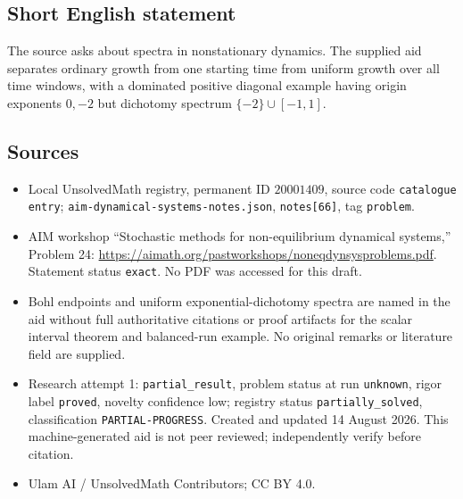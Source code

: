 \documentclass[11pt]{article}
\begin{document}
\subsection{Short English statement}
The source asks about spectra in nonstationary dynamics. The supplied aid separates ordinary growth from one starting time from uniform growth over all time windows, with a dominated positive diagonal example having origin exponents \(0,-2\) but dichotomy spectrum \(\{-2\}\cup[-1,1]\).
\subsection{Sources}
\begin{itemize}
\item Local UnsolvedMath registry, permanent ID \(20001409\), source code \texttt{catalogue entry}; \texttt{aim-dynamical-systems-notes.json}, \texttt{notes[66]}, tag \texttt{problem}.
\item AIM workshop ``Stochastic methods for non-equilibrium dynamical systems,'' Problem 24: \url{https://aimath.org/pastworkshops/noneqdynsysproblems.pdf}. Statement status \texttt{exact}. No PDF was accessed for this draft.
\item Bohl endpoints and uniform exponential-dichotomy spectra are named in the aid without full authoritative citations or proof artifacts for the scalar interval theorem and balanced-run example. No original remarks or literature field are supplied.
\item Research attempt 1: \texttt{partial\_result}, problem status at run \texttt{unknown}, rigor label \texttt{proved}, novelty confidence low; registry status \texttt{partially\_solved}, classification \texttt{PARTIAL-PROGRESS}. Created and updated 14 August 2026. This machine-generated aid is not peer reviewed; independently verify before citation.
\item Ulam AI / UnsolvedMath Contributors; CC BY 4.0.
\end{itemize}
\end{document}
